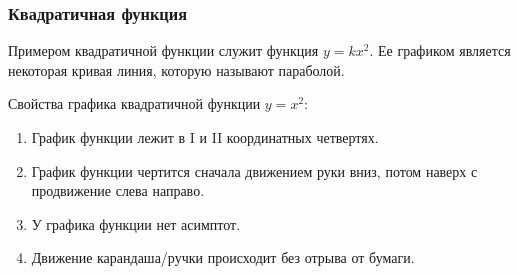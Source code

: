 \documentclass[algebra,twocolumn]{pum}
\date{24.03.20}
\begin{document}
\subsubsection*{Квадратичная функция}
Примером квадратичной функции служит функция $y=kx^2$. Ее графиком является некоторая кривая линия, которую называют параболой.

  \begin{center} 
  \end{center}

Свойства графика квадратичной функции $y=x^2$:
\begin{enumerate}[nosep]
  \item График функции лежит в I и II координатных четвертях.
  \item График функции чертится сначала движением руки вниз, потом наверх с продвижение слева направо.
  \item У графика функции нет асимптот.
  \item Движение карандаша/ручки происходит без отрыва от бумаги.
\end{enumerate}
\end{document}
